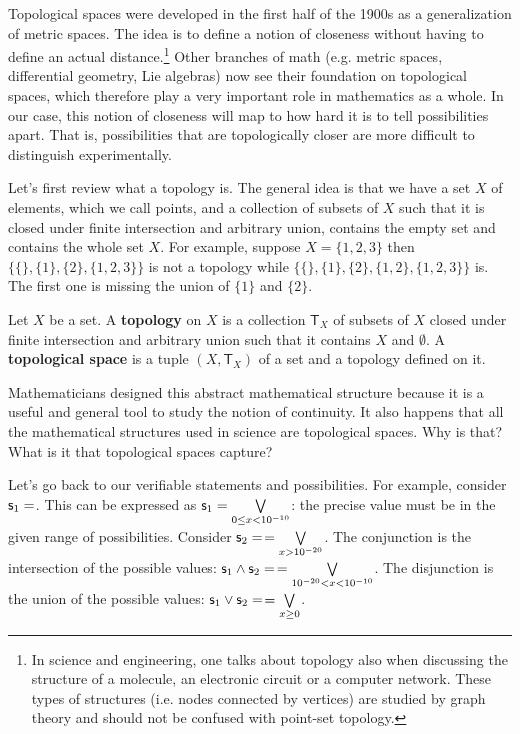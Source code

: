 \documentclass[11pt,letterpaper,fleqn]{memoir} %
\begin{document}
Topological spaces were developed in the first half of the 1900s as a generalization of metric spaces. The idea is to define a notion of closeness without having to define an actual distance.\footnote{In science and engineering, one talks about topology also when discussing the structure of a molecule, an electronic circuit or a computer network. These types of structures (i.e. nodes connected by vertices) are studied by graph theory and should not be confused with point-set topology.} Other branches of math (e.g. metric spaces, differential geometry, Lie algebras) now see their foundation on topological spaces, which therefore play a very important role in mathematics as a whole. In our case, this notion of closeness will map to how hard it is to tell possibilities apart. That is, possibilities that are topologically closer are more difficult to distinguish experimentally.

Let's first review what a topology is. The general idea is that we have a set $X$ of elements, which we call points, and a collection of subsets of $X$ such that it is closed under finite intersection and arbitrary union, contains the empty set and contains the whole set $X$. For example, suppose $X=\{1,2,3\}$ then $\{\{\}, \{1\}, \{2\},\{1,2,3\}\}$ is not a topology while $\{\{\}, \{1\}, \{2\},\{1,2\},\{1,2,3\}\}$ is. The first one is missing the union of $\{1\}$ and $\{2\}$.

\begin{mathSection}
	\begin{defn}
		Let $X$ be a set. A \textbf{topology} on $X$ is a collection $\mathsf{T}_X$ of subsets of $X$ closed under finite intersection and arbitrary union such that it contains $X$ and $\emptyset$. A \textbf{topological space} is a tuple $(X, \mathsf{T}_X)$ of a set and a topology defined on it.
	\end{defn}
\end{mathSection}

Mathematicians designed this abstract mathematical structure because it is a useful and general tool to study the notion of continuity. It also happens that all the mathematical structures used in science are topological spaces. Why is that? What is it that topological spaces capture?

Let's go back to our verifiable statements and possibilities. For example, consider $\mathsf{s}_1=$. This can be expressed as $\mathsf{s}_1=\bigvee\limits_{0\leq x<10^{-10}}$: the precise value must be in the given range of possibilities. Consider $\mathsf{s}_2=$$=\bigvee\limits_{x>10^{-20}}$. The conjunction is the intersection of the possible values: $\mathsf{s}_1\wedge\mathsf{s}_2=$$=\bigvee\limits_{10^{-20}< x<10^{-10}}$. The disjunction is the union of the possible values: $\mathsf{s}_1\vee\mathsf{s}_2=$$=\bigvee\limits_{x\geq0}$.
\end{document}

